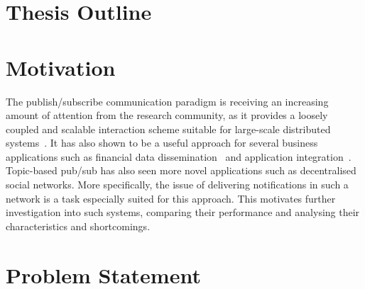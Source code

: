 \section{Thesis Outline}

\section{Motivation}

The publish/subscribe communication paradigm is receiving an increasing
amount of attention from the research community, as it provides a
loosely coupled and scalable interaction scheme suitable for large-scale
distributed systems~\cite{Eugster:2003}. It has also shown to be a useful
approach for several business applications such as financial data
dissemination~\cite{tibcorv} and application integration~\cite{goops}.
Topic-based pub/sub has also seen more novel applications such as
decentralised social networks. More specifically, the issue of
delivering notifications in such a network is a task especially suited
for this approach. This motivates further investigation into such
systems, comparing their performance and analysing their
characteristics and shortcomings.

\section{Problem Statement}
